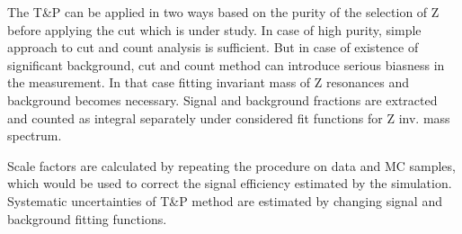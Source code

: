 \par The T\&P can be applied in two ways based on the purity of the selection of Z before applying the cut which is under study. In case of high purity, 
simple approach to cut and count analysis is sufficient. But in case of existence of significant background, cut and count method can introduce serious
biasness in the measurement. In that case fitting invariant mass of Z  resonances and background becomes necessary. Signal and background fractions are 
extracted and counted as integral separately under considered fit functions for Z inv. mass spectrum.

\par Scale factors are calculated by repeating the procedure on data and MC samples, which would be used to correct the signal efficiency estimated
by the simulation. Systematic uncertainties of T\&P method are estimated by changing signal and background fitting functions.
